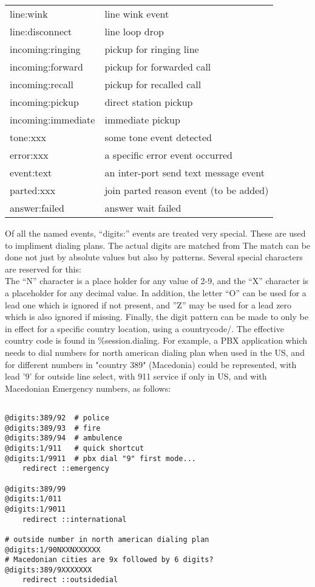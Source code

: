 \documentclass[a4paper,12pt]{article}
\begin{document}
\begin{supertabular}{ll}
line:wink			& line wink event \\
line:disconnect			& line loop drop \\
incoming:ringing		& pickup for ringing line \\
incoming:forward		& pickup for forwarded call \\
incoming:recall			& pickup for recalled call \\
incoming:pickup			& direct station pickup \\
incoming:immediate		& immediate pickup \\
tone:xxx			& some tone event detected \\
error:xxx			& a specific error event occurred \\
event:text			& an inter-port send text message event \\
parted:xxx			& join parted reason event (to be added) \\
answer:failed			& answer wait failed \\
\end{supertabular}

Of all the named events, ``digits:'' events are treated very special. 
These are used to impliment dialing plans.  The actual digits are
matched from %
The match can be done not just by absolute values but also by patterns.
Several special characters are reserved for this: \\

The ``N'' character is a place holder for any value of 2-9, and the
``X'' character is a placeholder for any decimal value.  In addition,
the letter ``O'' can be used for a lead one which is ignored if not
present, and ''Z'' may be used for a lead zero which is also ignored if
missing.  Finally, the digit pattern can be made to only be in effect
for a specific country location, using a countrycode/.  The effective
country code is found in \%session.dialing.  For example, a PBX
application which needs to dial numbers for north american dialing plan
when used in the US, and for different numbers in "country 389"
(Macedonia) could be represented, with lead '9' for outside line select,
with 911 service if only in US, and with Macedonian Emergency numbers,
as follows: \\

\begin{verbatim}

@digits:389/92	# police
@digits:389/93	# fire
@digits:389/94	# ambulence
@digits:1/911	# quick shortcut
@digits:1/9911	# pbx dial "9" first mode...
	redirect ::emergency

@digits:389/99
@digits:1/011
@digits:1/9011
	redirect ::international

# outside number in north american dialing plan
@digits:1/90NXXNXXXXXX		
# Macedonian cities are 9x followed by 6 digits?
@digits:389/9XXXXXXX
	redirect ::outsidedial

\end{verbatim}
\end{document}

